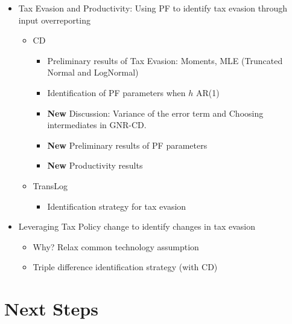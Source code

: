 \documentclass[
  12pt]{article}
\providecommand{\tightlist}{%
  \setlength{\itemsep}{0pt}\setlength{\parskip}{0pt}}\usepackage{longtable,booktabs,array}
\theoremstyle{definition}
\theoremstyle{remark}
\begin{document}
\begin{itemize}
\tightlist
\item
  Tax Evasion and Productivity: Using PF to identify tax evasion through
  input overreporting

  \begin{itemize}
  \tightlist
  \item
    CD

    \begin{itemize}
    \tightlist
    \item
      Preliminary results of Tax Evasion: Moments, MLE (Truncated Normal
      and LogNormal)
    \item
      Identification of PF parameters when \(h\) AR(1)
    \item
      \textbf{New} Discussion: Variance of the error term and Choosing
      intermediates in GNR-CD.
    \item
      \textbf{New} Preliminary results of PF parameters
    \item
      \textbf{New} Productivity results
    \end{itemize}
  \item
    TransLog

    \begin{itemize}
    \tightlist
    \item
      Identification strategy for tax evasion
    \end{itemize}
  \end{itemize}
\item
  Leveraging Tax Policy change to identify changes in tax evasion

  \begin{itemize}
  \tightlist
  \item
    Why? Relax common technology assumption
  \item
    Triple difference identification strategy (with CD)
  \end{itemize}
\end{itemize}

\section*{Next Steps}\label{next-steps}
\end{document}
